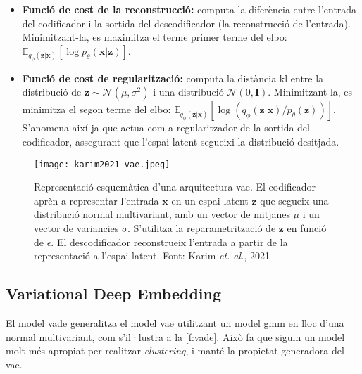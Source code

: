 \documentclass[CAT,BIB]{TFUOC}%
\begin{document}
        \begin{itemize}
            \item \textbf{Funció de cost de la reconstrucció:}
            computa la diferència entre l'entrada del codificador
            i la sortida del descodificador
            (la reconstrucció de l'entrada).
            Minimitzant-la, es maximitza el terme primer terme del \gls{elbo}:
            $\mathbb{E}_{q_\phi(\mathbf{z|x})} [ \log p_\theta(\mathbf{x|z}) ]$.

            \item \textbf{Funció de cost de regularització:}
            computa la distància \gls{kl}
            entre la distribució de $\mathbf{z} \sim \mathcal{N}(\mu, \sigma^2)$
            i una distribució $\mathcal{N}(0, \mathbf{I})$.
            Minimitzant-la, es minimitza el segon terme del \gls{elbo}:
            $\mathbb{E}_{q_\phi(\mathbf{z|x})} [ \log ( q_\phi(\mathbf{z|x}) / p_\theta(\mathbf{z}) ) ]$.
            S'anomena així ja que actua com a regularitzador
            de la sortida del codificador,
            assegurant que l'espai latent segueixi la distribució desitjada.
        \end{itemize}

        \begin{figure}
            \centering
            \texttt{[image: karim2021\_vae.jpeg]}
            \caption[\textit{Variational autoencoder}: arquitectura]{
                Representació esquemàtica d'una arquitectura \gls{vae}.
                El codificador aprèn a representar l'entrada $\mathbf{x}$
                en un espai latent $\mathbf{z}$
                que segueix una distribució normal multivariant,
                amb un vector de mitjanes $\mu$ i un vector de variancies $\sigma$.
                S'utilitza la reparametrització de $\mathbf{z}$ en funció de $\epsilon$.
                El descodificador reconstrueix l'entrada
                a partir de la representació a l'espai latent.
                Font: Karim \textit{et. al.}, 2021 \citep{Karim2021}
            }
            \label{f:vae_min}
        \end{figure}

    \subsection{Variational Deep Embedding}
    \label{s:metodes_vade}

        El model \gls{vade} generalitza el model \gls{vae}
        utilitzant un model \gls{gmm}
        en lloc d'una normal multivariant,
        com s'il·lustra a la \cref{f:vade}.
        Això fa que siguin un model molt més
        apropiat per realitzar \textit{clustering},
        i manté la propietat generadora del \gls{vae}.
\end{document}
